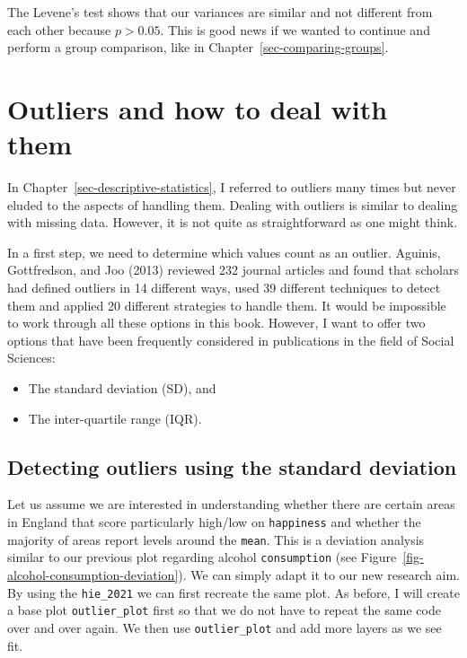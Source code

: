 \documentclass[
  letterpaper,
]{krantz}
\begin{document}
The Levene's test shows that our variances are similar and not different
from each other because \(p > 0.05\). This is good news if we wanted to
continue and perform a group comparison, like in
Chapter~\ref{sec-comparing-groups}.

\section{Outliers and how to deal with
them}\label{sec-dealing-with-outliers}

In Chapter~\ref{sec-descriptive-statistics}, I referred to outliers many
times but never eluded to the aspects of handling them. Dealing with
outliers is similar to dealing with missing data. However, it is not
quite as straightforward as one might think.

In a first step, we need to determine which values count as an outlier.
Aguinis, Gottfredson, and Joo (2013) reviewed 232 journal articles and
found that scholars had defined outliers in 14 different ways, used 39
different techniques to detect them and applied 20 different strategies
to handle them. It would be impossible to work through all these options
in this book. However, I want to offer two options that have been
frequently considered in publications in the field of Social Sciences:

\begin{itemize}
\item
  The standard deviation (SD), and
\item
  The inter-quartile range (IQR).
\end{itemize}

\subsection{Detecting outliers using the standard
deviation}\label{sec-ouliers-standard_deviation}

Let us assume we are interested in understanding whether there are
certain areas in England that score particularly high/low on
\texttt{happiness} and whether the majority of areas report levels
around the \texttt{mean}. This is a deviation analysis similar to our
previous plot regarding alcohol \texttt{consumption} (see
Figure~\ref{fig-alcohol-consumption-deviation}). We can simply adapt it
to our new research aim. By using the \texttt{hie\_2021} we can first
recreate the same plot. As before, I will create a base plot
\texttt{outlier\_plot} first so that we do not have to repeat the same
code over and over again. We then use \texttt{outlier\_plot} and add
more layers as we see fit.
\end{document}
